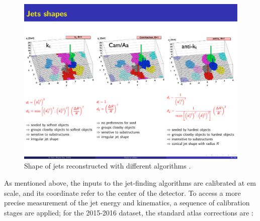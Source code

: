 \begin{figure}[h]
\includegraphics[width=\textwidth]{./figures/objects/jetsalg.pdf}
\caption[Shape of jets reconstructed with different algorithms]{Shape of jets reconstructed with different algorithms \cite{cacciari:antikt}.}
\label{fig:jetsalg}
\end{figure}

As mentioned above, the inputs to the jet-finding algorithms are calibrated at \gls{em} scale, and its coordinate refer to the center of the detector. To access a more precise measurement of the jet energy and kinematics, a sequence of calibration stages are applied; for the 2015-2016 dataset, the standard \gls{atlas} corrections are \cite{PhysRevD.96.0720}:

